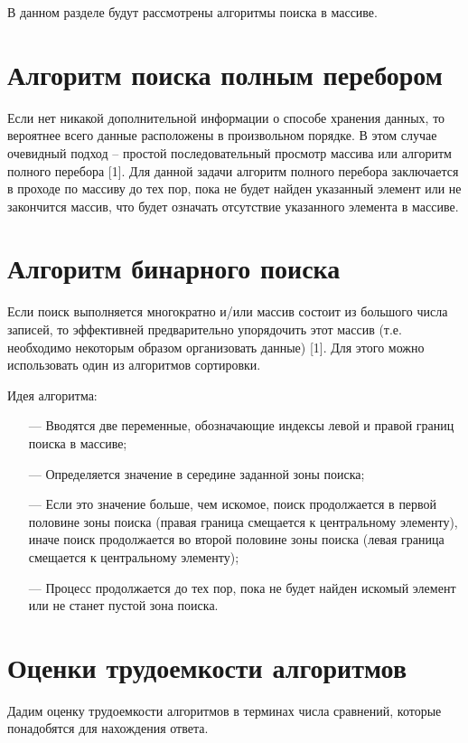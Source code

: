 \documentclass{bmstu}
\begin{document}
В данном разделе будут рассмотрены алгоритмы поиска в массиве.

\section{Алгоритм поиска полным перебором}
Если нет никакой дополнительной информации о способе хранения данных, то вероятнее всего данные расположены в произвольном порядке. В этом случае очевидный подход – простой последовательный просмотр массива или алгоритм полного перебора [1].
Для данной задачи алгоритм полного перебора заключается в проходе по массиву до тех пор, пока не будет найден указанный элемент или не закончится массив, что будет означать отсутствие указанного элемента в массиве.

\section{Алгоритм бинарного поиска}
Если поиск выполняется многократно и/или массив состоит из большого числа записей, то эффективней предварительно упорядочить этот массив (т.е. необходимо некоторым образом организовать
данные) [1].
Для этого можно использовать один из алгоритмов сортировки.

Идея алгоритма:
\begin{itemize}
	\item[---] Вводятся две переменные, обозначающие индексы левой и правой границ поиска в массиве;
	\item[---] Определяется значение в середине заданной зоны поиска;
	\item[---] Если это значение больше, чем искомое, поиск продолжается в первой половине зоны поиска (правая граница смещается к центральному элементу), иначе поиск продолжается во второй половине зоны поиска (левая граница смещается к центральному элементу);
	\item[---] Процесс продолжается до тех пор, пока не будет найден искомый элемент или не станет пустой зона поиска.
\end{itemize}

\section{Оценки трудоемкости алгоритмов}
Дадим оценку трудоемкости алгоритмов в терминах числа сравнений, которые понадобятся для нахождения ответа.
\end{document}
